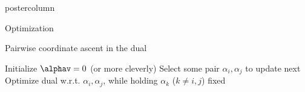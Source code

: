 \documentclass{beamer}
\begin{document}
\begin{frame}[fragile]{}
\begin{columns}
\begin{column}{.31\textwidth}
\begin{beamercolorbox}[center]{postercolumn}
\begin{minipage}{.98\textwidth}
{\begin{myblock}{Optimization}
\begin{algorithm}[H]
  \caption{Pairwise coordinate ascent in the dual}
  \begin{algorithmic}[1]
    \State Initialize $\alphav = 0$ (or more cleverly)
      \State Select some pair $\alpha_i, \alpha_j$ to update next
      \State Optimize dual w.r.t. $\alpha_i, \alpha_j$, while holding $\alpha_k$ ($k\ne i, j$) fixed
      \EndFor
  \end{algorithmic}
\end{algorithm}
  
\end{myblock}

  }
  
  \end{minipage}
  \end{beamercolorbox}
  \end{column}
  
  
  
\end{columns}
\end{frame}
\end{document}

